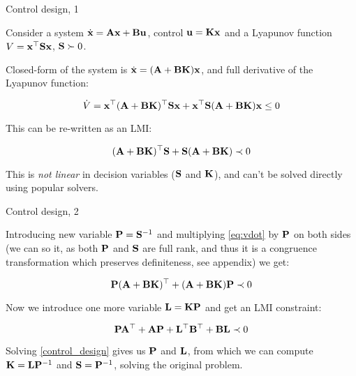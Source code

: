 \documentclass{beamer}
\begin{document}
\begin{frame}{Control design, 1}
	\begin{flushleft}
		
		Consider a system $\dot{\mathbf{x}} = \mathbf{A}\mathbf{x} + \mathbf{B}\mathbf{u}$, control $\mathbf{u} = \mathbf{K}\mathbf{x}$ and a Lyapunov function $V = \mathbf{x}^\top\mathbf{S}\mathbf{x}$, $\mathbf{S} \succ 0$.
		
		\bigskip
		
		Closed-form of the system is $\dot{\mathbf{x}} = (\mathbf{A} + \mathbf{B}\mathbf{K})\mathbf{x}$, and full derivative of the Lyapunov function:
		
		\begin{equation}
			\dot V = \mathbf{x}^\top (\mathbf{A} + \mathbf{B}\mathbf{K})^\top\mathbf{S}\mathbf{x} + \mathbf{x}^\top\mathbf{S} (\mathbf{A} + \mathbf{B}\mathbf{K}) \mathbf{x} \leq 0
		\end{equation}
	
		This can be re-written as an LMI:
		
		\begin{equation}
			\label{eq:vdot}
			(\mathbf{A} + \mathbf{B}\mathbf{K})^\top\mathbf{S} + \mathbf{S} (\mathbf{A} + \mathbf{B}\mathbf{K}) \prec 0
		\end{equation}
	
		This is \emph{not linear} in decision variables ($\mathbf{S}$ and $\mathbf{K}$), and can't be solved directly using popular solvers.
		
	\end{flushleft}
\end{frame}




\begin{frame}{Control design, 2}
	\begin{flushleft}
		
		Introducing new variable $\mathbf{P} = \mathbf{S}^{-1}$ and multiplying \eqref{eq:vdot} by $\mathbf{P}$ on both sides (we can so it, as both $\mathbf{P}$ and $\mathbf{S}$ are full rank, and thus it is a congruence transformation which preserves definiteness, see appendix) we get:
		
		\begin{equation}
			\mathbf{P}(\mathbf{A} + \mathbf{B}\mathbf{K})^\top + (\mathbf{A} + \mathbf{B}\mathbf{K})\mathbf{P} \prec 0
		\end{equation}
	
		Now we introduce one more variable $\mathbf{L} = \mathbf{K}\mathbf{P}$ and get an LMI constraint:
		
		\begin{equation}
			\label{control_design}
			\mathbf{P}\mathbf{A}^\top + \mathbf{A}\mathbf{P} + \mathbf{L}^\top\mathbf{B}^\top + \mathbf{B}\mathbf{L} \prec 0
		\end{equation}
		
		Solving \eqref{control_design} gives us $\mathbf{P}$ and $\mathbf{L}$, from which we can compute $\mathbf{K} = \mathbf{L}\mathbf{P}^{-1}$ and $\mathbf{S} = \mathbf{P}^{-1}$, solving the original problem.
		
	\end{flushleft}
\end{frame}
\end{document}
